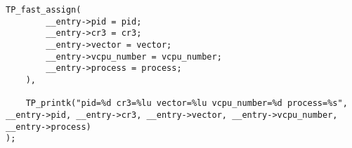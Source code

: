 \documentclass{report}
\begin{document}
\begin{spacing}{1.5}
\begin{lstlisting}[caption={Implementation of KVM SYSCALL Linux Kernel Custom Tracepoint},captionpos=b]
    TP_fast_assign(
        __entry->pid = pid;
        __entry->cr3 = cr3;
        __entry->vector = vector;
        __entry->vcpu_number = vcpu_number;
        __entry->process = process;
    ),

    TP_printk("pid=%d cr3=%lu vector=%lu vcpu_number=%d process=%s", __entry->pid, __entry->cr3, __entry->vector, __entry->vcpu_number, __entry->process)
);
\end{lstlisting}

\end{spacing}
\end{document}
